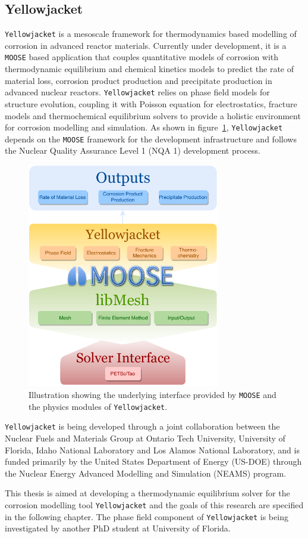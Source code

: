 	\subsection{Yellowjacket}
	\texttt{Yellowjacket} is a mesoscale framework for thermodynamics based modelling of corrosion in advanced reactor materials. Currently under development, it is a \texttt{MOOSE} based application that couples quantitative models of corrosion with thermodynamic equilibrium and chemical kinetics models to predict the rate of material loss, corrosion product production and precipitate production in advanced nuclear reactors. \texttt{Yellowjacket} relies on phase field models for structure evolution, coupling it with Poisson equation for electrostatics, fracture models and thermochemical equilibrium solvers to provide a holistic environment for corrosion modelling and simulation. As shown in figure~\ref{fig:yjmoose}, \texttt{Yellowjacket} depends on the \texttt{MOOSE} framework for the development infrastructure and follows the Nuclear Quality Assurance Level 1 (NQA 1) \cite{NQA-web-page} development process.

	\begin{figure}[htbp]
		\centering
		\includegraphics[width=0.75\textwidth]{figures/Yellowjacket_MOOSE.pdf}
		\caption{Illustration showing the underlying interface provided by \texttt{MOOSE} and the physics modules of \texttt{Yellowjacket}.}
		\label{fig:yjmoose}
	\end{figure}

	\texttt{Yellowjacket} is being developed through a joint collaboration between the Nuclear Fuels and Materials Group at Ontario Tech University, University of Florida, Idaho National Laboratory and Los Alamos National Laboratory, and is funded primarily by the United States Department of Energy (US-DOE) through the Nuclear Energy Advanced Modelling and Simulation (NEAMS) program.

	This thesis is aimed at developing a thermodynamic equilibrium solver for the corrosion modelling tool \texttt{Yellowjacket} and the goals of this research are specified in the following chapter. The phase field component of \texttt{Yellowjacket} is being investigated by another PhD student at University of Florida.
